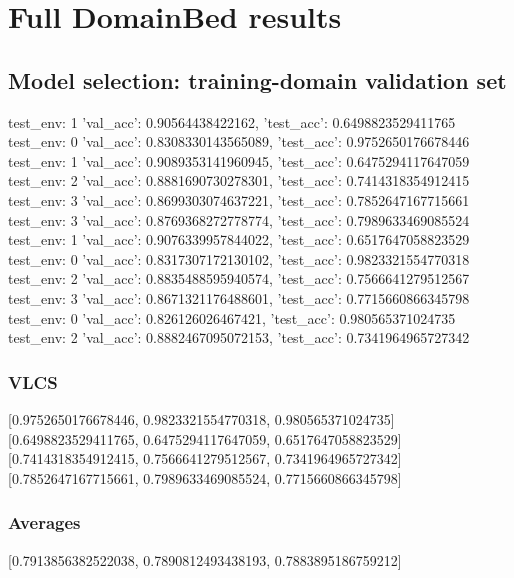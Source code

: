 \documentclass{article}
\begin{document}
\section{Full DomainBed results}

\subsection{Model selection: training-domain validation set}
test_env: 1
{'val_acc': 0.90564438422162, 'test_acc': 0.6498823529411765}
test_env: 0
{'val_acc': 0.8308330143565089, 'test_acc': 0.9752650176678446}
test_env: 1
{'val_acc': 0.9089353141960945, 'test_acc': 0.6475294117647059}
test_env: 2
{'val_acc': 0.8881690730278301, 'test_acc': 0.7414318354912415}
test_env: 3
{'val_acc': 0.8699303074637221, 'test_acc': 0.7852647167715661}
test_env: 3
{'val_acc': 0.8769368272778774, 'test_acc': 0.7989633469085524}
test_env: 1
{'val_acc': 0.9076339957844022, 'test_acc': 0.6517647058823529}
test_env: 0
{'val_acc': 0.8317307172130102, 'test_acc': 0.9823321554770318}
test_env: 2
{'val_acc': 0.8835488595940574, 'test_acc': 0.7566641279512567}
test_env: 3
{'val_acc': 0.8671321176488601, 'test_acc': 0.7715660866345798}
test_env: 0
{'val_acc': 0.826126026467421, 'test_acc': 0.980565371024735}
test_env: 2
{'val_acc': 0.8882467095072153, 'test_acc': 0.7341964965727342}

\subsubsection{VLCS}
[0.9752650176678446, 0.9823321554770318, 0.980565371024735]
[0.6498823529411765, 0.6475294117647059, 0.6517647058823529]
[0.7414318354912415, 0.7566641279512567, 0.7341964965727342]
[0.7852647167715661, 0.7989633469085524, 0.7715660866345798]

\begin{center}
\end{center}

\subsubsection{Averages}
[0.7913856382522038, 0.7890812493438193, 0.7883895186759212]

\begin{center}
\end{center}
\end{document}
